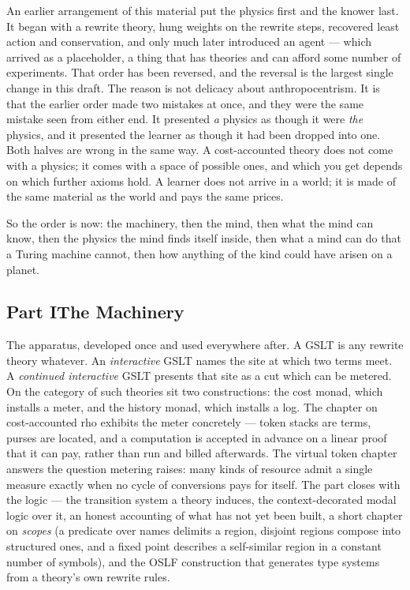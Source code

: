 \documentclass[12pt,openright,twoside]{book}
\theoremstyle{remark}
\theoremstyle{plain}
\theoremstyle{remark}
\theoremstyle{plain}
\theoremstyle{plain}
\begin{document}
An earlier arrangement of this material put the physics first and the
knower last.
It began with a rewrite theory, hung weights on the rewrite steps,
recovered least action and conservation, and only much later introduced
an agent --- which arrived as a placeholder, a thing that has theories
and can afford some number of experiments.
That order has been reversed, and the reversal is the largest single
change in this draft.
The reason is not delicacy about anthropocentrism.
It is that the earlier order made two mistakes at once, and they were the
same mistake seen from either end.
It presented \emph{a} physics as though it were \emph{the} physics, and
it presented the learner as though it had been dropped into one.
Both halves are wrong in the same way.
A cost-accounted theory does not come with a physics; it comes with a
space of possible ones, and which you get depends on which further axioms
hold.
A learner does not arrive in a world; it is made of the same material as
the world and pays the same prices.

So the order is now: the machinery, then the mind, then what the mind can
know, then the physics the mind finds itself inside, then what a mind can
do that a Turing machine cannot, then how anything of the kind could have
arisen on a planet.

\bigskip

\subsection*{Part I\quad The Machinery}

The apparatus, developed once and used everywhere after.
A GSLT is any rewrite theory whatever.
An \emph{interactive} GSLT names the site at which two terms meet.
A \emph{continued interactive} GSLT presents that site as a cut which can
be metered.
On the category of such theories sit two constructions: the cost monad,
which installs a meter, and the history monad, which installs a log.
The chapter on cost-accounted rho exhibits the meter concretely --- token
stacks are terms, purses are located, and a computation is accepted in
advance on a linear proof that it can pay, rather than run and billed
afterwards.
The virtual token chapter answers the question metering raises: many
kinds of resource admit a single measure exactly when no cycle of
conversions pays for itself.
The part closes with the logic --- the transition system a theory
induces, the context-decorated modal logic over it, an honest accounting
of what has not yet been built, a short chapter on \emph{scopes} (a
predicate over names delimits a region, disjoint regions compose into
structured ones, and a fixed point describes a self-similar region in a
constant number of symbols), and the OSLF construction that generates
type systems from a theory's own rewrite rules.
\end{document}
